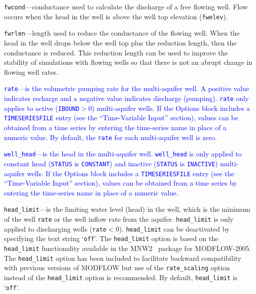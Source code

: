 \begin{description}
\item \texttt{fwcond}---conductance used to calculate the discharge of a free flowing well.  Flow occurs when the head in the well is above the well top elevation (\texttt{fwelev}).

\item \texttt{fwrlen}---length used to reduce the conductance of the flowing well.  When the head in the well drops below the well top plus the reduction length, then the conductance is reduced.  This reduction length can be used to improve the stability of simulations with flowing wells so that there is not an abrupt change in flowing well rates.

\item \textcolor{blue}{\texttt{rate}---is the volumetric pumping rate for the multi-aquifer well. A positive value indicates recharge and a negative value indicates discharge (pumping). \texttt{rate} only applies to active (\texttt{IBOUND}$>0$) multi-aquifer wells. If the Options block includes a \texttt{TIMESERIESFILE} entry (see the ``Time-Variable Input'' section), values can be obtained from a time series by entering the time-series name in place of a numeric value. By default, the \texttt{rate} for each multi-aquifer well is zero.}

\item \textcolor{blue}{\texttt{well\_head}---is the head in the multi-aquifer well. \texttt{well\_head} is only applied to constant head (\texttt{STATUS} is \texttt{CONSTANT}) and inactive (\texttt{STATUS} is \texttt{INACTIVE}) multi-aquifer wells. If the Options block includes a \texttt{TIMESERIESFILE} entry (see the ``Time-Variable Input'' section), values can be obtained from a time series by entering the time-series name in place of a numeric value.}

\item \texttt{head\_limit}---is the limiting water level (head) in the well, which is the minimum of the well \texttt{rate} or the well inflow rate from the aquifer. \texttt{head\_limit} is only applied to discharging wells (\texttt{rate}$<0$). \texttt{head\_limit} can be deactivated by specifying the text string `\texttt{off}'. The \texttt{head\_limit} option is based on the \texttt{head\_limit} functionality available in the MNW2~\citep{konikow2009} package for MODFLOW-2005. The \texttt{head\_limit} option has been included to facilitate backward compatibility with previous versions of MODFLOW but use of the \texttt{rate\_scaling} option instead of the \texttt{head\_limit} option is recommended. By default, \texttt{head\_limit} is `\texttt{off}'.


\end{description}

